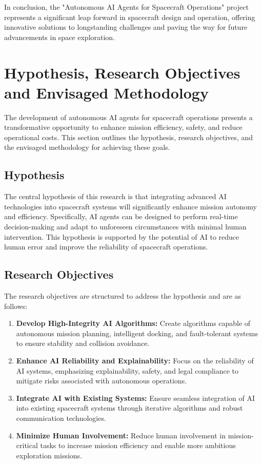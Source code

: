 \documentclass[a4paper, 11pt]{article}
\begin{document}
In conclusion, the "Autonomous AI Agents for Spacecraft Operations" project represents a significant leap forward in spacecraft design and operation, offering innovative solutions to longstanding challenges and paving the way for future advancements in space exploration.
\section{Hypothesis, Research Objectives and Envisaged Methodology}

The development of autonomous AI agents for spacecraft operations presents a transformative opportunity to enhance mission efficiency, safety, and reduce operational costs. This section outlines the hypothesis, research objectives, and the envisaged methodology for achieving these goals.

\subsection{Hypothesis}

The central hypothesis of this research is that integrating advanced AI technologies into spacecraft systems will significantly enhance mission autonomy and efficiency. Specifically, AI agents can be designed to perform real-time decision-making and adapt to unforeseen circumstances with minimal human intervention. This hypothesis is supported by the potential of AI to reduce human error and improve the reliability of spacecraft operations.

\subsection{Research Objectives}

The research objectives are structured to address the hypothesis and are as follows:

\begin{enumerate}
    \item \textbf{Develop High-Integrity AI Algorithms:} Create algorithms capable of autonomous mission planning, intelligent docking, and fault-tolerant systems to ensure stability and collision avoidance.
    \item \textbf{Enhance AI Reliability and Explainability:} Focus on the reliability of AI systems, emphasizing explainability, safety, and legal compliance to mitigate risks associated with autonomous operations.
    \item \textbf{Integrate AI with Existing Systems:} Ensure seamless integration of AI into existing spacecraft systems through iterative algorithms and robust communication technologies.
    \item \textbf{Minimize Human Involvement:} Reduce human involvement in mission-critical tasks to increase mission efficiency and enable more ambitious exploration missions.
\end{enumerate}
\end{document}

